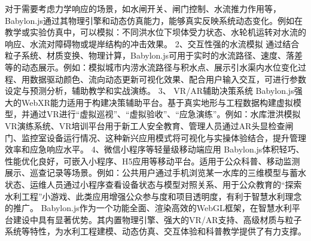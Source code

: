 {对于需要考虑力学响应的场景，如水闸开关、闸门控制、水流推力作用等，Babylon.js通过其物理引擎和动态仿真能力，能够真实反映系统动态变化。例如在教学或实验仿真中，可以模拟：不同洪水位下坝体受力状态、水轮机运转对水流的响应、水流对障碍物或堤岸结构的冲击效果。
2、交互性强的水流模拟
通过结合粒子系统、材质变换、物理计算，Babylon.js可用于实时的水流路径、速度、落差等的动态展示。例如：模拟城市内涝水流路径与积水点、展示引水渠内水位变化过程、用数据驱动颜色、流向动态更新可视化效果、配合用户输入交互，可进行参数设定与预测分析，辅助教学和实战演练。
3、 VR/AR辅助决策系统
Babylon.js强大的WebXR能力适用于构建决策辅助平台。基于真实地形与工程数据构建虚拟模型，并通过VR进行``虚拟巡视''、``虚拟验收''、``应急演练''。例如：水库泄洪模拟VR演练系统、VR培训平台用于新工人安全教育、管理人员通过AR头显检查闸门、监控室设备运行情况、这种新兴应用模式将可视化与实操体验结合，提升管理效率和应急响应水平。
4、微信小程序等轻量级移动端应用
Babylon.js体积轻巧、性能优化良好，可嵌入小程序、H5应用等移动平台。适用于公众科普、移动监测展示、巡查记录等场景。例如：公共用户通过手机浏览某一水库的三维模型与蓄水状态、运维人员通过小程序查看设备状态与模型对照关系、用于公众教育的``探索水利工程''小游戏、此类应用增强公众参与度和项目透明度，有利于智慧水利理念的推广。
Babylon.js作为一个功能全面、渲染高效的WebGL框架，在智慧水利平台建设中具有显著优势。其内置物理引擎、强大的VR/AR支持、高级材质与粒子系统等特性，为水利工程建模、动态仿真、交互体验和科普教学提供了有力支撑。
}
